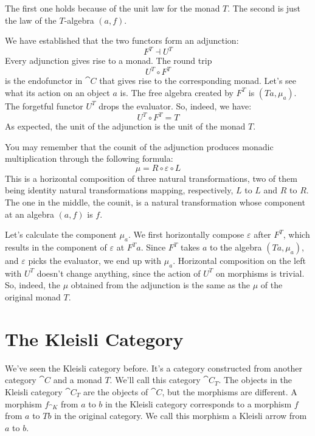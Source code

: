 \noindent
The first one holds because of the unit law for the monad $T$.
The second is just the law of the $T$-algebra $(a, f)$.

We have established that the two functors form an adjunction:
\[F^T \dashv U^T\]
Every adjunction gives rise to a monad. The round trip
\[U^T \circ F^T\]
is the endofunctor in $\cat{C}$ that gives rise to the corresponding monad.
Let's see what its action on an object $a$ is. The free algebra
created by $F^T$ is $(T a, \mu_a)$. The forgetful functor
$U^T$ drops the evaluator. So, indeed, we have:
\[U^T \circ F^T = T\]
As expected, the unit of the adjunction is the unit of the monad $T$.

You may remember that the counit of the adjunction produces monadic
multiplication through the following formula:
\[\mu = R \circ \varepsilon \circ L\]
This is a horizontal composition of three natural transformations, two
of them being identity natural transformations mapping, respectively,
$L$ to $L$ and $R$ to $R$. The one in the
middle, the counit, is a natural transformation whose component at an
algebra $(a, f)$ is $f$.

Let's calculate the component $\mu_a$. We first horizontally compose
$\varepsilon$ after $F^T$, which results in the component of
$\varepsilon$ at $F^T a$. Since $F^T$ takes $a$ to the
algebra $(T a, \mu_a)$, and $\varepsilon$ picks the evaluator, we end
up with $\mu_a$. Horizontal composition on the left with $U^T$
doesn't change anything, since the action of $U^T$ on morphisms is
trivial. So, indeed, the $\mu$ obtained from the adjunction is the
same as the $\mu$ of the original monad $T$.

\section{The Kleisli Category}

We've seen the Kleisli category before. It's a category constructed from
another category $\cat{C}$ and a monad $T$. We'll call this
category $\cat{C}_T$. The objects in the Kleisli category
$\cat{C}_T$ are the objects of $\cat{C}$, but the morphisms
are different. A morphism $f_{\cat{K}}$ from $a$ to $b$ in
the Kleisli category corresponds to a morphism $f$ from
$a$ to $T b$ in the original category. We call this
morphism a Kleisli arrow from $a$ to $b$.

